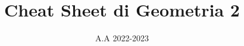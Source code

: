 \documentclass[10pt]{report}
\title{\Huge{Cheat Sheet di Geometria 2}}
\date{A.A 2022-2023}
\author{}
\begin{document}
\maketitle

\begin{multicols*}{2}
    \tableofcontents
\end{multicols*}

\newpage





\end{document}
